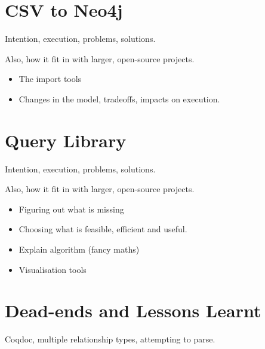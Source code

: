 \section{CSV to Neo4j}
\color{red}
Intention, execution, problems, solutions.

Also, how it fit in with larger, open-source projects.
\begin{itemize}
  \item The import tools
  \item Changes in the model, tradeoffs, impacts on execution.
\end{itemize}
\color{black}

\section{Query Library}
\color{red}
Intention, execution, problems, solutions.

Also, how it fit in with larger, open-source projects.
\begin{itemize}
  \item Figuring out what is missing
  \item Choosing what is feasible, efficient and useful.
  \item Explain algorithm (fancy maths)
  \item Visualisation tools
\end{itemize}
\color{black}

\section{Dead-ends and Lessons Learnt}
\color{red}
Coqdoc, multiple relationship types, attempting to parse.
\color{black}
